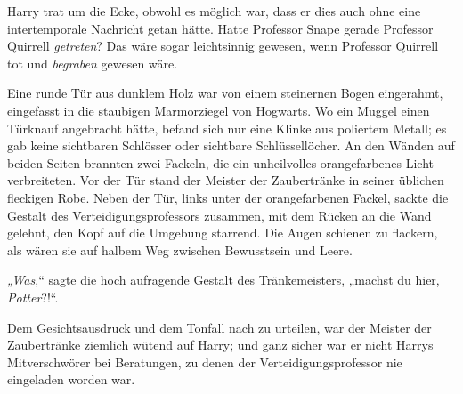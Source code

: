 Harry trat um die Ecke, obwohl es möglich war, dass er dies auch ohne eine intertemporale Nachricht getan hätte.
Hatte Professor Snape gerade Professor Quirrell \emph{getreten}? Das wäre sogar leichtsinnig gewesen, wenn Professor Quirrell tot und \emph{begraben} gewesen wäre.

Eine runde Tür aus dunklem Holz war von einem steinernen Bogen eingerahmt, eingefasst in die staubigen Marmorziegel von Hogwarts. Wo ein Muggel einen Türknauf angebracht hätte, befand sich nur eine Klinke aus poliertem Metall; es gab keine sichtbaren Schlösser oder sichtbare Schlüssellöcher. An den Wänden auf beiden Seiten brannten zwei Fackeln, die ein unheilvolles orangefarbenes Licht verbreiteten.
Vor der Tür stand der Meister der Zaubertränke in seiner üblichen fleckigen Robe. Neben der Tür, links unter der orangefarbenen Fackel, sackte die Gestalt des Verteidigungsprofessors zusammen, mit dem Rücken an die Wand gelehnt, den Kopf auf die Umgebung starrend. Die Augen schienen zu flackern, als wären sie auf halbem Weg zwischen Bewusstsein und Leere.

\emph{„Was},“ sagte die hoch aufragende Gestalt des Tränkemeisters, „machst du hier, \emph{Potter}?!“.

Dem Gesichtsausdruck und dem Tonfall nach zu urteilen, war der Meister der Zaubertränke ziemlich wütend auf Harry; und ganz sicher war er nicht Harrys Mitverschwörer bei Beratungen, zu denen der Verteidigungsprofessor nie eingeladen worden war.

